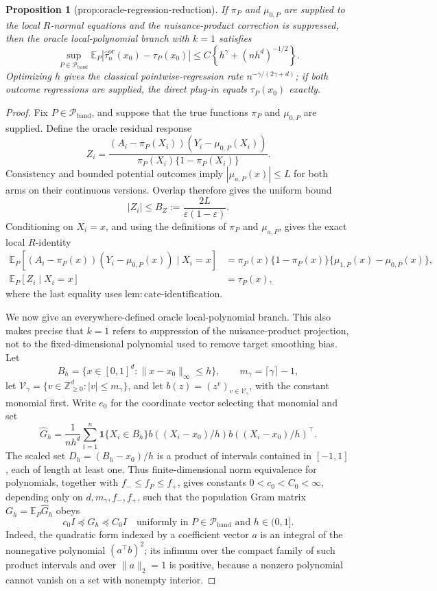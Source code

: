 \documentclass{article}
\newtheorem{proposition}{Proposition}
\begin{document}
\begin{proposition}[prop:oracle-regression-reduction]\label{prop:oracle-regression-reduction}
If \(\pi_P\) and \(\mu_{0,P}\) are supplied to the local \(R\)-normal equations and the nuisance-product correction is suppressed, then the oracle local-polynomial branch with \(k=1\) satisfies \[\sup_{P\in\mathcal{P}_{\mathrm{band}}}\mathbb{E}_P|\widehat\tau_n^{\mathrm{or}}(x_0)-\tau_P(x_0)|\leq C\left\{h^\gamma+(nh^d)^{-1/2}\right\}.\] Optimizing \(h\) gives the classical pointwise-regression rate \(n^{-\gamma/(2\gamma+d)}\); if both outcome regressions are supplied, the direct plug-in equals \(\tau_P(x_0)\) exactly.
\end{proposition}
\begin{proof}
Fix \(P\in\mathcal P_{\mathrm{band}}\), and suppose that the true functions \(\pi_P\) and \(\mu_{0,P}\) are supplied.  Define the oracle residual response
\[
 Z_i=\frac{(A_i-\pi_P(X_i))(Y_i-\mu_{0,P}(X_i))}
 {\pi_P(X_i)\{1-\pi_P(X_i)\}}.
\]
Consistency and bounded potential outcomes imply \(|\mu_{a,P}(x)|\le L\) for both arms on their continuous versions.  Overlap therefore gives the uniform bound
\[
 |Z_i|\le B_Z:=\frac{2L}{\varepsilon(1-\varepsilon)}.
\]
Conditioning on \(X_i=x\), and using the definitions of \(\pi_P\) and \(\mu_{a,P}\), gives the exact local \(R\)-identity
\[
\begin{aligned}
 \mathbb E_P[(A_i-\pi_P(x))(Y_i-\mu_{0,P}(x))\mid X_i=x]
 &=\pi_P(x)\{1-\pi_P(x)\}
   \{\mu_{1,P}(x)-\mu_{0,P}(x)\},\\
 \mathbb E_P[Z_i\mid X_i=x]&=\tau_P(x),
\end{aligned}
\]
where the last equality uses \(\mathrm{lem:cate\mbox{-}identification}\).

We now give an everywhere-defined oracle local-polynomial branch.  This also makes precise that \(k=1\) refers to suppression of the nuisance-product projection, not to the fixed-dimensional polynomial used to remove target smoothing bias.  Let
\[
 B_h=\{x\in[0,1]^d:\|x-x_0\|_\infty\le h\},
 \qquad m_\gamma=\lceil\gamma\rceil-1,
\]
let \(\mathcal V_\gamma=\{v\in\mathbb Z_{\ge0}^d:|v|\le m_\gamma\}\), and let \(b(z)=(z^v)_{v\in\mathcal V_\gamma}\), with the constant monomial first.  Write \(e_0\) for the coordinate vector selecting that monomial and set
\[
 \widehat G_h=\frac1{nh^d}\sum_{i=1}^n
 \mathbf 1\{X_i\in B_h\}b((X_i-x_0)/h)b((X_i-x_0)/h)^\top.
\]
The scaled set \(D_h=(B_h-x_0)/h\) is a product of intervals contained in \([-1,1]\), each of length at least one.  Thus finite-dimensional norm equivalence for polynomials, together with \(f_-\le f_P\le f_+\), gives constants \(0<c_0<C_0<\infty\), depending only on \(d,m_\gamma,f_-,f_+\), such that the population Gram matrix \(G_h=\mathbb E_P\widehat G_h\) obeys
\[
 c_0 I\preceq G_h\preceq C_0 I
 \quad\text{uniformly in }P\in\mathcal P_{\mathrm{band}}
 \text{ and }h\in(0,1].
\]
Indeed, the quadratic form indexed by a coefficient vector \(a\) is an integral of the nonnegative polynomial \((a^\top b)^2\); its infimum over the compact family of such product intervals and over \(\|a\|_2=1\) is positive, because a nonzero polynomial cannot vanish on a set with nonempty interior.


\end{proof}
\end{document}
